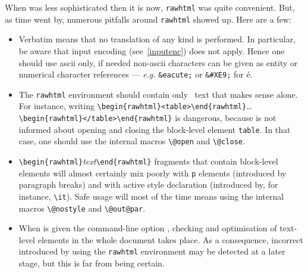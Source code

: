 When \hevea{} was less sophisticated then it is now,
\texttt{rawhtml} was quite convenient.
But, as time went by,
numerous pitfalls around \texttt{rawhtml} showed up. Here are a few:
\begin{itemize}
\item
Verbatim means that no translation of any kind is performed. In
particular, be aware that input encoding (see~\ref{inputenc}) does
not apply. Hence one should use ascii only, if needed
non-ascii characters can be given as
entity or numerical character references --- \emph{e.g.}
\verb+&eacute;+ or \verb+&#XE9;+ for \'e.

\item
The \texttt{rawhtml}
environment should contain only \html~text that makes sense alone.
For instance, writing
\verb+\begin{rawhtml}<table>\end{rawhtml}+\ldots{}
\verb+\begin{rawhtml}</table>\end{rawhtml}+ is
dangerous, because \hevea{} is not informed about opening and closing
the block-level element \texttt{table}. In that case, one should use
the internal macros \verb+\@open+ and \verb+\@close+.

\item \verb+\begin{rawhtml}+\textit{text}\verb+\end{rawhtml}+ fragments that
contain block-level elements will almost certainly mix poorly with
\verb+p+ elements (introduced by paragraph breaks) and with active
style declaration (introduced by, for instance, \verb+\it+).
Safe usage will most of the time means using the internal macros
\verb+\@nostyle+ and \verb+\@out@par+.

\item When \hevea{} is given the command-line option ,
checking and optimisation of text-level elements in the whole document
takes place.  As a consequence, incorrect \html{} introduced by using
the \texttt{rawhtml} environment may be detected at a later stage,
but this is far from being certain.
\end{itemize}


